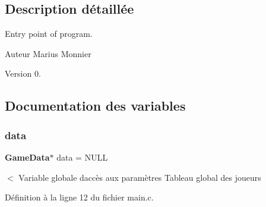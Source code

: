 \subsection{Description détaillée}
Entry point of program. 

\begin{DoxyAuthor}{Auteur}
Marius Monnier 
\end{DoxyAuthor}
\begin{DoxyVersion}{Version}
0. 
\end{DoxyVersion}


\subsection{Documentation des variables}
\mbox{\label{main_8c_a882ad77a7df764b098f98136eb56a83a}} 
\subsubsection{data}
{\footnotesize\ttfamily \textbf{ Game\+Data}$\ast$ data = N\+U\+LL}

$<$ Variable globale d\textquotesingle{}accès aux paramètres Tableau global des joueurs 

Définition à la ligne 12 du fichier main.\+c.

